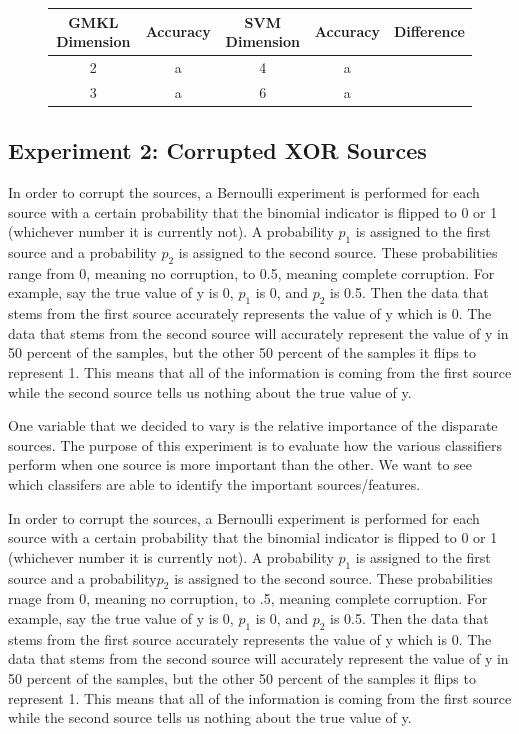 \documentclass{article}
\begin{document}
\begin{figure}
\begin{center}
\begin{tabular}{|c| c| c| c| c| }
\hline
GMKL Dimension & Accuracy & SVM Dimension & Accuracy & Difference \\
\hline
2 & a & 4 & a \\
\hline
3 & a & 6 &a
\end{tabular}
\end{center}
\end{figure}










\subsection*{Experiment 2: Corrupted XOR Sources}

In order to corrupt the sources, a Bernoulli experiment is performed for each
source with a certain probability that the binomial indicator is flipped to 0
or 1 (whichever number it is currently not). A probability $p_1$ is assigned to
the first source and a probability $p_2$ is assigned to the second source.
These probabilities range from 0, meaning no corruption, to 0.5, meaning
complete corruption. For example, say the true value of y is 0, $p_1$ is 0, and
$p_2$ is 0.5. Then the data that stems from the first source accurately
represents the value of y which is 0. The data that stems from the second
source will accurately represent the value of y in 50 percent of the samples,
but the other 50 percent of the samples it flips to represent 1. This means
that all of the information is coming from the first source while the second
source tells us nothing about the true value of y.

One variable that we decided to vary is the relative importance of the disparate sources. The purpose of this experiment is to evaluate how the various classifiers perform when one source is more important than the other. We want to see which classifers are able to identify the important sources/features.

In order to corrupt the sources, a Bernoulli experiment is performed for each source with a certain probability that the binomial indicator is flipped to 0 or 1 (whichever number it is currently not). A probability $p_1$ is assigned to the first source and a probability$ p_2$ is assigned to the second source. These probabilities rnage from 0, meaning no corruption, to .5, meaning complete corruption. For example, say the true value of y is 0, $p_1$ is 0, and $p_2$ is 0.5. Then the data that stems from the first source accurately represents the value of y which is 0. The data that stems from the second source will accurately represent the value of y in 50 percent of the samples, but the other 50 percent of the samples it flips to represent 1. This means that all of the information is coming from the first source while the second source tells us nothing about the true value of y.
\end{document}
